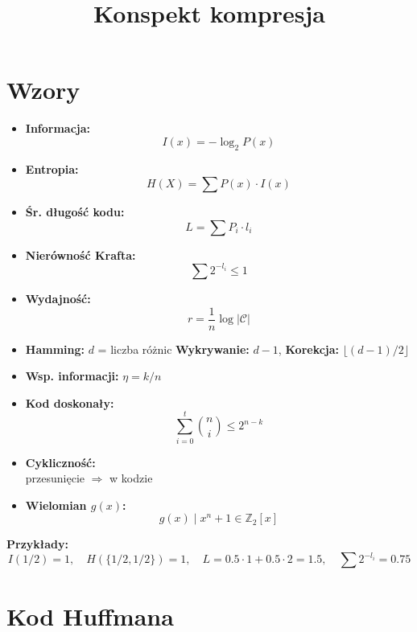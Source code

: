 \documentclass{../konspekt}
\title{Konspekt kompresja}
\begin{document}
\begin{multicols}{2}

  \section*{Wzory}

  \begin{multicols}{2}

    \begin{itemize}
      \item \textbf{Informacja:} $$I(x) = -\log_2 P(x)$$
      \item \textbf{Entropia:} $$H(X) = \sum P(x) \cdot I(x)$$
      \item \textbf{Śr. długość kodu:} $$L = \sum P_i \cdot l_i$$
      \item \textbf{Nierówność Krafta:} $$\sum 2^{-l_i} \leq 1$$
      \item \textbf{Wydajność:} $$r = \frac{1}{n} \log |\mathcal{C}|$$
    \end{itemize}

    \columnbreak

    \begin{itemize}
      \item \textbf{Hamming:} $d$ = liczba różnic
        \textbf{Wykrywanie:} $d - 1$, \textbf{Korekcja:} $\lfloor
        (d - 1)/2 \rfloor$
      \item \textbf{Wsp. informacji:} $\eta = k/n$
      \item \textbf{Kod doskonały:} $$\sum_{i=0}^{t} \binom{n}{i} \leq 2^{n-k}$$
      \item \textbf{Cykliczność:} \\ przesunięcie $\Rightarrow$ w kodzie
      \item \textbf{Wielomian $g(x)$:} $$g(x) \mid x^n + 1 \in \mathbb{Z}_2[x]$$
    \end{itemize}

  \end{multicols}

  \vspace{-2em}
  \textbf{Przykłady:}
  {\small
    $$
    I(1/2)=1, \quad H(\{1/2,1/2\})=1, \quad
    L=0.5\cdot1+0.5\cdot2=1.5, \quad \sum 2^{-l_i} = 0.75
    $$
  }

  \section*{Kod Huffmana}

  \begin{multicols}{2}


\end{multicols}
\end{multicols}
\end{document}

